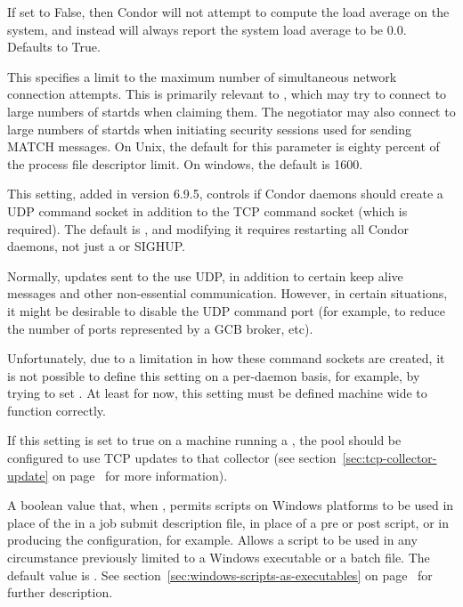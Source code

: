 \begin{description}
\label{param:SysapiGetLoadavg}
\item[\Macro{SYSAPI\_GET\_LOADAVG}]
  If set to False, then Condor will not attempt to compute the load average
  on the system, and instead will always report the system load average
  to be 0.0.  Defaults to True.

\label{param:NetworkMaxPendingConnects}
\item[\Macro{NETWORK\_MAX\_PENDING\_CONNECTS}]
  This specifies a limit to the maximum number of simultaneous network
  connection attempts.  This is primarily relevant to ,
  which may try to connect to large numbers of startds when claiming
  them.  The negotiator may also connect to large numbers of startds
  when initiating security sessions used for sending MATCH messages.  On
  Unix, the default for this parameter is eighty percent of the process file
  descriptor limit.  On windows, the default is 1600.

\label{param:WantUDPCommandSocket}
\item[\Macro{WANT\_UDP\_COMMAND\_SOCKET}]
  This setting, added in version 6.9.5, controls if Condor daemons
  should create a UDP command socket in addition to the TCP command
  socket (which is required).
  The default is , and modifying it requires restarting all
  Condor daemons, not just a  or SIGHUP.

  Normally, updates sent to the  use UDP, in
  addition to certain keep alive messages and other non-essential
  communication.
  However, in certain situations, it might be desirable to disable the
  UDP command port (for example, to reduce the number of ports
  represented by a GCB broker, etc).

  Unfortunately, due to a limitation in how these command sockets are
  created, it is not possible to define this setting on a per-daemon
  basis, for example, by trying to set
  .
  At least for now, this setting must be defined machine wide to
  function correctly.

  If this setting is set to true on a machine running a
  , the pool should be configured to use TCP updates
  to that collector (see section~\ref{sec:tcp-collector-update} on
  page~\pageref{sec:tcp-collector-update} for more information).

\label{param:AllowScriptsToRunAsExecutables}
\item[\Macro{ALLOW\_SCRIPTS\_TO\_RUN\_AS\_EXECUTABLES}]
  A boolean value that, when , permits scripts on Windows
  platforms to be used in place of the  in a job
  submit description file, in place of a  pre or post script,
  or in producing the configuration, for example. 
  Allows a script to be used in any circumstance previously
  limited to a Windows executable or a batch file.
  The default value is .
  See section~\ref{sec:windows-scripts-as-executables} on
  page~\pageref{sec:windows-scripts-as-executables} for further description.


\end{description}
